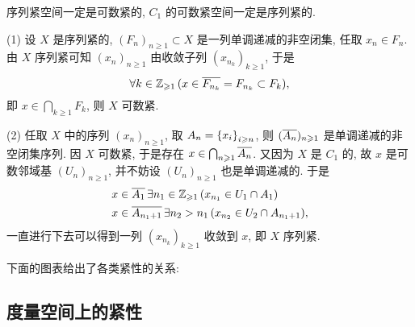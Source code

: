     \begin{Proposition}
        序列紧空间一定是可数紧的, $ C_1 $ 的可数紧空间一定是序列紧的.
    \end{Proposition}
    \begin{Proof}
        (1) 设 $ X $ 是序列紧的, $ (F_n)_{n\geqslant 1}\subset X $ 是一列单调递减的非空闭集, 任取 $ x_n\in F_n $. 由 $ X $ 序列紧可知 $ (x_n)_{n\geqslant 1} $ 由收敛子列 $ (x_{n_k})_{k\geqslant 1} $, 于是
        \[
            \forall k\in\Zi\,(x\in\baro{F_{n_k}}=F_{n_k}\subset F_k),
        \]
        即 $ x\in\bigcap_{k\geqslant 1}F_k $, 则 $ X $ 可数紧.

        (2) 任取 $ X $ 中的序列 $ (x_n)_{n\geqslant 1} $, 取 $ A_n=\set{x_i}_{i\geqslant n} $, 则 $ (\baro{A_n})_{n\geqslant 1} $ 是单调递减的非空闭集序列. 因 $ X $ 可数紧, 于是存在 $ x\in\bigcap_{n\geqslant 1}\baro{A_n} $. 又因为 $ X $ 是 $ C_1 $ 的, 故 $ x $ 是可数邻域基 $ (U_n)_{n\geqslant 1} $, 并不妨设 $ (U_n)_{n\geqslant 1} $ 也是单调递减的. 于是
        \[
            \begin{aligned}
                & x\in\baro{A_1}\,\exists n_1\in\Zi\,(x_{n_1}\in U_1\cap A_1)\\
                & x\in\baro{A_{n_1+1}}\,\exists n_2>n_1\,(x_{n_2}\in U_2\cap A_{n_1+1}),
            \end{aligned}
        \]
        一直进行下去可以得到一列 $ (x_{n_k})_{k\geqslant 1} $ 收敛到 $ x $, 即 $ X $ 序列紧. 
    \end{Proof}

    下面的图表给出了各类紧性的关系:
    \begin{center}
    \end{center}

\subsection{度量空间上的紧性}

